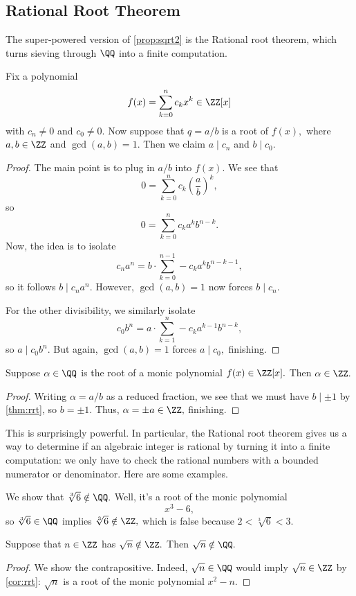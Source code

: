 \subsection{Rational Root Theorem}
The super-powered version of \autoref{prop:sqrt2} is the Rational root theorem, which turns sieving through $\QQ$ into a finite computation.
\begin{thm} \label{thm:rrt}
	Fix a polynomial
	\[f(x)=\sum_{k=0}^nc_kx^k\in\ZZ[x]\]
	with $c_n\ne0$ and $c_0\ne0.$ Now suppose that $q=a/b$ is a root of $f(x),$ where $a,b\in\ZZ$ and $\gcd(a,b)=1.$ Then we claim $a\mid c_n$ and $b\mid c_0.$
\end{thm}
\begin{proof}
	The main point is to plug in $a/b$ into $f(x).$ We see that
	\[0=\sum_{k=0}^nc_k\left(\frac ab\right)^k,\]
	so
	\[0=\sum_{k=0}^nc_ka^kb^{n-k}.\]
	Now, the idea is to isolate
	\[c_na^n=b\cdot\sum_{k=0}^{n-1}-c_ka^kb^{n-k-1},\]
	so it follows $b\mid c_na^n.$ However, $\gcd(a,b)=1$ now forces $\boxed{b\mid c_n}.$
	
	For the other divisibility, we similarly isolate
	\[c_0b^n=a\cdot\sum_{k=1}^n-c_ka^{k-1}b^{n-k},\]
	so $a\mid c_0b^n.$ But again, $\gcd(a,b)=1$ forces $\boxed{a\mid c_0},$ finishing.
\end{proof}
\begin{cor} \label{cor:rrt}
	Suppose $\alpha\in\QQ$ is the root of a monic polynomial $f(x)\in\ZZ[x].$ Then $\alpha\in\ZZ.$
\end{cor}
\begin{proof}
	Writing $\alpha=a/b$ as a reduced fraction, we see that we must have $b\mid\pm1$ by \autoref{thm:rrt}, so $b=\pm1.$ Thus, $\alpha=\pm a\in\ZZ,$ finishing.
\end{proof}
This is surprisingly powerful. In particular, the Rational root theorem gives us a way to determine if an algebraic integer is rational by turning it into a finite computation: we only have to check the rational numbers with a bounded numerator or denominator. Here are some examples.
\begin{ex}
	We show that $\sqrt[3]6\notin\QQ.$ Well, it's a root of the monic polynomial
	\[x^3-6,\]
	so $\sqrt[3]6\in\QQ$ implies $\sqrt[3]6\notin\ZZ,$ which is false because $2<\sqrt[3]6<3.$
\end{ex}
\begin{cor}
	Suppose that $n\in\ZZ$ has $\sqrt n\notin\ZZ.$ Then $\sqrt n\notin\QQ.$
\end{cor}
\begin{proof}
	We show the contrapositive. Indeed, $\sqrt n\in\QQ$ would imply $\sqrt n\in\ZZ$ by \autoref{cor:rrt}: $\sqrt n$ is a root of the monic polynomial $x^2-n.$
\end{proof}
